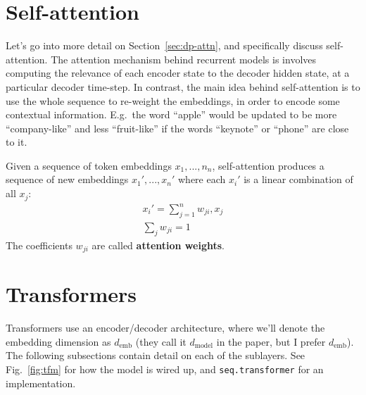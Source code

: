 \documentclass[11pt]{article}
\numberwithin{equation}{section}
\begin{document}
\newcommand{\demb}{d_{\text{emb}}}

\section{Self-attention}
Let's go into more detail on Section~\ref{sec:dp-attn}, and specifically discuss self-attention. The attention mechanism behind recurrent models is involves computing the relevance of each encoder state to the decoder hidden state, at a particular decoder time-step. In contrast, the main idea behind self-attention is to use the whole sequence to re-weight the embeddings, in order to encode some contextual information. E.g.\ the word ``apple'' would be updated to be more ``company-like'' and less ``fruit-like'' if the words ``keynote'' or ``phone'' are close to it. 

Given a sequence of token embeddings $x_1,...,n_n$, self-attention produces a sequence of new embeddings $x_1',...,x_n'$  where each $x_i'$ is a linear combination of all $x_j$:
\begin{align}
x_i' = \sum_{j=1}^n w_{ji}, x_j \\
\sum_{j}w_{ji} = 1
\end{align}
The coefficients $w_{ji}$ are called \textbf{attention weights}.  


\section{Transformers}

Transformers \citep{Vaswani17} use an encoder/decoder architecture, where we'll denote the embedding dimension as $\demb$ (they call it $d_{\text{model}}$ in the paper, but I prefer $\demb$). The following subsections contain detail on each of the sublayers. See Fig.~\ref{fig:tfm} for how the model is wired up, and \verb+seq.transformer+ for an implementation.
\end{document}
